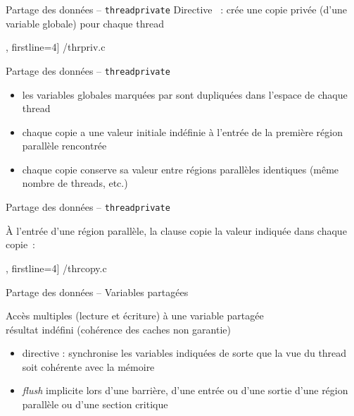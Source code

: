 \begin {frame} [fragile] {Partage des données -- \texttt {threadprivate}}
    Directive ~: crée une copie
    privée (d'une variable globale) pour chaque thread

    \scriptsize\lstmonstyle, firstline=4] {\inc/thrpriv.c} 
\end{frame}

\begin {frame} {Partage des données -- \texttt {threadprivate}}
    \begin {itemize}
	\item les variables globales marquées par 
	    sont dupliquées dans l'espace de chaque thread

	\item chaque copie a une valeur initiale indéfinie à l'entrée
	    de la première région parallèle rencontrée

	\item chaque copie conserve sa valeur entre régions
	    parallèles identiques (même nombre de threads, etc.)

    \end {itemize}
\end {frame}

\begin {frame} [fragile] {Partage des données -- \texttt {threadprivate}}

    À l'entrée d'une région parallèle, la clause 
    copie la valeur indiquée dans chaque copie~:

    \scriptsize\lstmonstyle, firstline=4] {\inc/thrcopy.c}

\end{frame}

\begin {frame} {Partage des données -- Variables partagées}

    Accès multiples (lecture et écriture) à une variable partagée \\
    \implique résultat indéfini (cohérence des caches non garantie)

    \vspace* {3mm}

    \begin {itemize}
	\item directive  : synchronise
	    les variables indiquées de sorte que la vue du thread soit
	    cohérente avec la mémoire

	\item \emph {flush} implicite lors d'une barrière, d'une
	    entrée ou d'une sortie d'une région parallèle ou d'une
	    section critique

    \end {itemize}




\end{frame}

